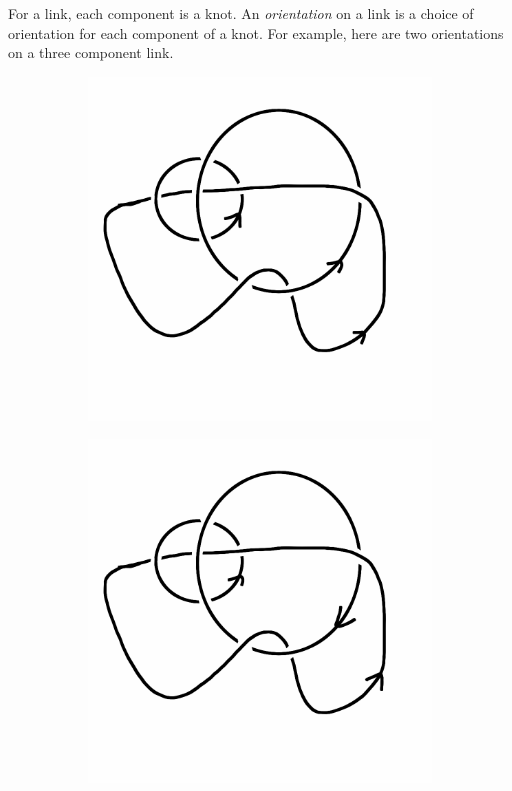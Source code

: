 \documentclass[12pt,letterpaper]{article}
\theoremstyle{definition}
\begin{document}
For a link, each component is a knot. 
An \emph{orientation} on a link is a choice of orientation for each component of a knot.
For example, here are two orientations on a three component link.

\begin{figure}[h]
    \centering
    \begin{subfigure}{.3\textwidth}
        \centering
        \includegraphics[width=\textwidth]{knotpics/threelinka.png}
    \end{subfigure}
    \hspace{1cm}
    \begin{subfigure}{.3\textwidth}
        \centering         
        \includegraphics[width=\textwidth]{knotpics/threelinkb.png}

\end{subfigure}
\end{figure}
\end{document}
